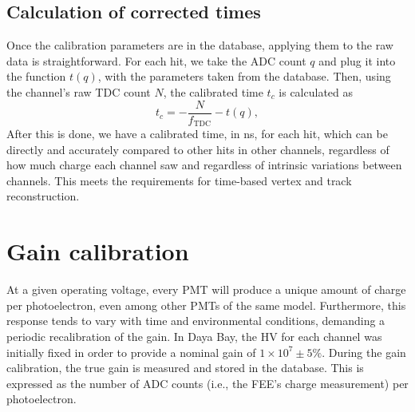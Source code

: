 \documentclass[../thesis.tex]{subfiles}
\begin{document}

\begin{comment}
Show the tof-corrected times; comment on TDC discretization.
\end{comment}

\subsection{Calculation of corrected times}

Once the calibration parameters are in the database, applying them to the raw data is straightforward. For each hit, we take the ADC count $q$ and plug it into the function $t(q)$, with the parameters taken from the database. Then, using the channel's raw TDC count $N$, the calibrated time $t_c$ is calculated as
\[ t_c = -\frac{N}{f_\mathrm{TDC}} - t(q), \]
After this is done, we have a calibrated time, in ns, for each hit, which can be directly and accurately compared to other hits in other channels, regardless of how much charge each channel saw and regardless of intrinsic variations between channels. This meets the requirements for time-based vertex and track reconstruction.

\section{Gain calibration}

At a given operating voltage, every PMT will produce a unique amount of charge per photoelectron, even among other PMTs of the same model. Furthermore, this response tends to vary with time and environmental conditions, demanding a periodic recalibration of the gain. In Daya Bay, the HV for each channel was initially fixed in order to provide a nominal gain of $1 \times 10^7 \pm 5\%$. During the gain calibration, the true gain is measured and stored in the database. This is expressed as the number of ADC counts (i.e., the FEE's charge measurement) per photoelectron.
\end{document}

